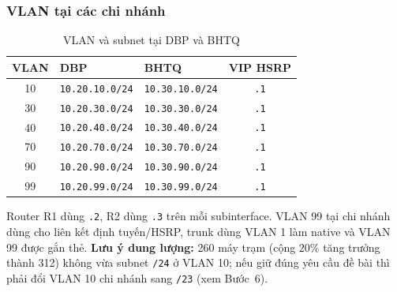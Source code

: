 \subsubsection{VLAN tại các chi nhánh}
\begin{small}
\begin{longtable}{|c|l|l|c|}
\caption{VLAN và subnet tại DBP và BHTQ} \label{tab:vlan_branch} \\
\hline
\textbf{VLAN} & \textbf{DBP} & \textbf{BHTQ} & \textbf{VIP HSRP} \\ \hline
\endhead
10 & \texttt{10.20.10.0/24} & \texttt{10.30.10.0/24} & \texttt{.1} \\ \hline
30 & \texttt{10.20.30.0/24} & \texttt{10.30.30.0/24} & \texttt{.1} \\ \hline
40 & \texttt{10.20.40.0/24} & \texttt{10.30.40.0/24} & \texttt{.1} \\ \hline
70 & \texttt{10.20.70.0/24} & \texttt{10.30.70.0/24} & \texttt{.1} \\ \hline
90 & \texttt{10.20.90.0/24} & \texttt{10.30.90.0/24} & \texttt{.1} \\ \hline
99 & \texttt{10.20.99.0/24} & \texttt{10.30.99.0/24} & \texttt{.1} \\ \hline
\end{longtable}
\end{small}
\noindent Router R1 dùng \texttt{.2}, R2 dùng \texttt{.3} trên mỗi subinterface. VLAN 99 tại chi nhánh dùng cho liên kết định tuyến/HSRP, trunk dùng VLAN 1 làm native và VLAN 99 được gắn thẻ. \textbf{Lưu ý dung lượng:} 260 máy trạm (cộng $20\%$ tăng trưởng thành 312) không vừa subnet \texttt{/24} ở VLAN 10; nếu giữ đúng yêu cầu đề bài thì phải đổi VLAN 10 chi nhánh sang \texttt{/23} (xem Bước~6).

